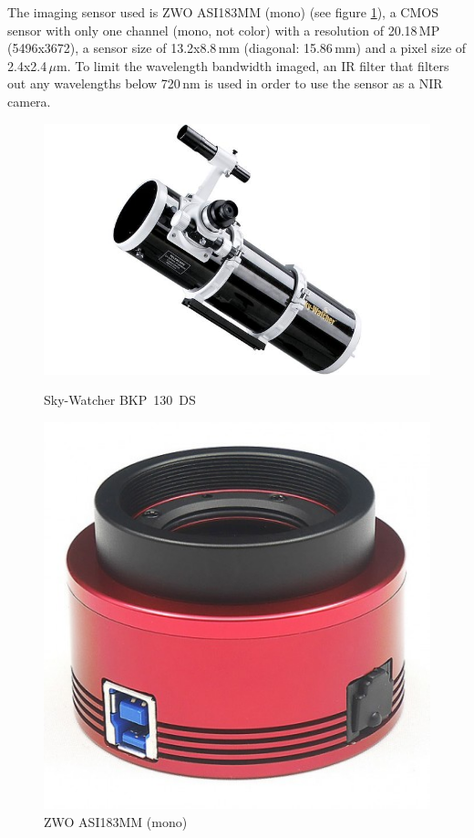 The imaging sensor used is ZWO ASI183MM (mono) (see figure \ref{fig::4.1-sensor}), a CMOS sensor with only one channel (mono, not color) with a resolution of 20.18\,MP (5496x3672), a sensor size of 13.2x8.8\,mm (diagonal: 15.86\,mm) and a pixel size of 2.4x2.4\,$\mu$m. To limit the wavelength bandwidth imaged, an IR filter that filters out any wavelengths below 720\,nm is used in order to use the sensor as a NIR camera.

\begin{figure}[h]
	\centering
	\begin{minipage}[t]{0.4\linewidth}
		\centering
		\includegraphics[width=0.8\linewidth]{4-experiment-design/img/setup/SkyWatcher_BKP130DS}
		\caption{Sky-Watcher BKP~130~DS \cite{telescope} }
		\label{fig::4.1-telescope}
	\end{minipage}
	\hspace{0.1\linewidth}
	\begin{minipage}[t]{0.4\linewidth}
		\centering
		\includegraphics[width=0.5\linewidth]{4-experiment-design/img/setup/ZWO_ASI183MM}
		\caption{ZWO ASI183MM (mono) \cite{CMOS_sensor} }
		\label{fig::4.1-sensor}
	\end{minipage}
	
\end{figure}

